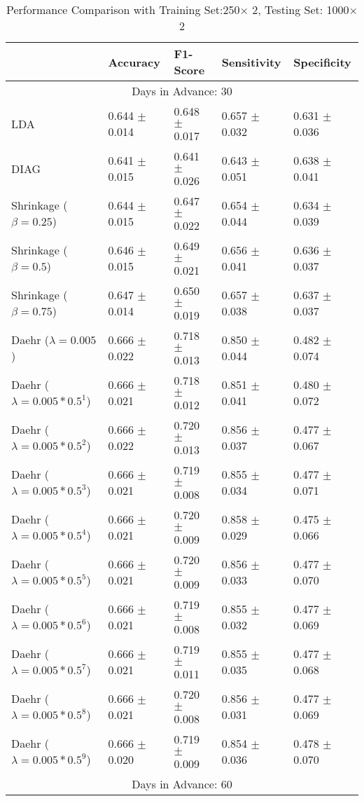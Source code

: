 \begin{table}
\caption{Performance Comparison with Training Set:250$\times$ 2, Testing Set: 1000$\times$2}
\footnotesize
\centering
\begin{tabular}{*{5}{l}}
\toprule
 & Accuracy & F1-Score & Sensitivity & Specificity\\
\hline\multicolumn{5}{c}{  Days in Advance: 30}\\\hline
LDA&0.644 $\pm$ 0.014&0.648 $\pm$ 0.017&0.657 $\pm$ 0.032&0.631 $\pm$ 0.036\\
DIAG&0.641 $\pm$ 0.015&0.641 $\pm$ 0.026&0.643 $\pm$ 0.051&0.638 $\pm$ 0.041\\
Shrinkage ($\beta=0.25$)&0.644 $\pm$ 0.015&0.647 $\pm$ 0.022&0.654 $\pm$ 0.044&0.634 $\pm$ 0.039\\
Shrinkage ($\beta=0.5$)&0.646 $\pm$ 0.015&0.649 $\pm$ 0.021&0.656 $\pm$ 0.041&0.636 $\pm$ 0.037\\
Shrinkage ($\beta=0.75$)&0.647 $\pm$ 0.014&0.650 $\pm$ 0.019&0.657 $\pm$ 0.038&0.637 $\pm$ 0.037\\
Daehr ($\lambda=0.005$)&0.666 $\pm$ 0.022&0.718 $\pm$ 0.013&0.850 $\pm$ 0.044&0.482 $\pm$ 0.074\\
Daehr ($\lambda=0.005*0.5^1$)&0.666 $\pm$ 0.021&0.718 $\pm$ 0.012&0.851 $\pm$ 0.041&0.480 $\pm$ 0.072\\
Daehr ($\lambda=0.005*0.5^2$)&0.666 $\pm$ 0.022&0.720 $\pm$ 0.013&0.856 $\pm$ 0.037&0.477 $\pm$ 0.067\\
Daehr ($\lambda=0.005*0.5^3$)&0.666 $\pm$ 0.021&0.719 $\pm$ 0.008&0.855 $\pm$ 0.034&0.477 $\pm$ 0.071\\
Daehr ($\lambda=0.005*0.5^4$)&0.666 $\pm$ 0.021&0.720 $\pm$ 0.009&0.858 $\pm$ 0.029&0.475 $\pm$ 0.066\\
Daehr ($\lambda=0.005*0.5^5$)&0.666 $\pm$ 0.021&0.720 $\pm$ 0.009&0.856 $\pm$ 0.033&0.477 $\pm$ 0.070\\
Daehr ($\lambda=0.005*0.5^6$)&0.666 $\pm$ 0.021&0.719 $\pm$ 0.008&0.855 $\pm$ 0.032&0.477 $\pm$ 0.069\\
Daehr ($\lambda=0.005*0.5^7$)&0.666 $\pm$ 0.021&0.719 $\pm$ 0.011&0.855 $\pm$ 0.035&0.477 $\pm$ 0.068\\
Daehr ($\lambda=0.005*0.5^8$)&0.666 $\pm$ 0.021&0.720 $\pm$ 0.008&0.856 $\pm$ 0.031&0.477 $\pm$ 0.069\\
Daehr ($\lambda=0.005*0.5^9$)&0.666 $\pm$ 0.020&0.719 $\pm$ 0.009&0.854 $\pm$ 0.036&0.478 $\pm$ 0.070\\
\hline\multicolumn{5}{c}{  Days in Advance: 60}\\\hline

\end{tabular}
\end{table}

